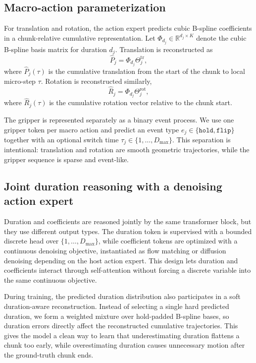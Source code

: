\documentclass[10pt,twocolumn,letterpaper]{article}
\begin{document}
\subsection{Macro-action parameterization}
For translation and rotation, the action expert predicts cubic B-spline coefficients in a chunk-relative cumulative representation. Let $\Phi_{d_j}\in\mathbb{R}^{d_j\times K}$ denote the cubic B-spline basis matrix for duration $d_j$. Translation is reconstructed as
\begin{equation}
\hat P_j = \Phi_{d_j}\Theta^{\mathrm{tr}}_j,
\end{equation}
where $\hat P_j(\tau)$ is the cumulative translation from the start of the chunk to local micro-step $\tau$. Rotation is reconstructed similarly,
\begin{equation}
\hat R_j = \Phi_{d_j}\Theta^{\mathrm{rot}}_j,
\end{equation}
where $\hat R_j(\tau)$ is the cumulative rotation vector relative to the chunk start.

The gripper is represented separately as a binary event process. We use one gripper token per macro action and predict an event type $e_j\in\{\texttt{hold},\texttt{flip}\}$ together with an optional switch time $\tau_j\in\{1,\dots,D_{\max}\}$. This separation is intentional: translation and rotation are smooth geometric trajectories, while the gripper sequence is sparse and event-like.

\subsection{Joint duration reasoning with a denoising action expert}
Duration and coefficients are reasoned jointly by the same transformer block, but they use different output types. The duration token is supervised with a bounded discrete head over $\{1,\dots,D_{\max}\}$, while coefficient tokens are optimized with a continuous denoising objective, instantiated as flow matching or diffusion denoising depending on the host action expert. This design lets duration and coefficients interact through self-attention without forcing a discrete variable into the same continuous objective.

During training, the predicted duration distribution also participates in a soft duration-aware reconstruction. Instead of selecting a single hard predicted duration, we form a weighted mixture over hold-padded B-spline bases, so duration errors directly affect the reconstructed cumulative trajectories. This gives the model a clean way to learn that underestimating duration flattens a chunk too early, while overestimating duration causes unnecessary motion after the ground-truth chunk ends.
\end{document}
